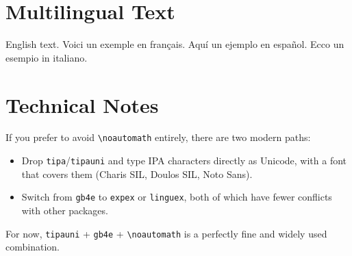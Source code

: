\documentclass[11pt,a4paper]{article}
\begin{document}
\section{Multilingual Text}

English text.
\textfrench{Voici un exemple en français.}
\textspanish{Aquí un ejemplo en español.}
\textitalian{Ecco un esempio in italiano.}

\section{Technical Notes}

If you prefer to avoid \texttt{\textbackslash noautomath} entirely, there are two modern paths:
\begin{itemize}
    \item Drop \texttt{tipa}/\texttt{tipauni} and type IPA characters directly as Unicode, with a font that covers them (Charis SIL, Doulos SIL, Noto Sans).
    \item Switch from \texttt{gb4e} to \texttt{expex} or \texttt{linguex}, both of which have fewer conflicts with other packages.
\end{itemize}
For now, \texttt{tipauni} + \texttt{gb4e} + \texttt{\textbackslash noautomath} is a perfectly fine and widely used combination.

\end{document}

